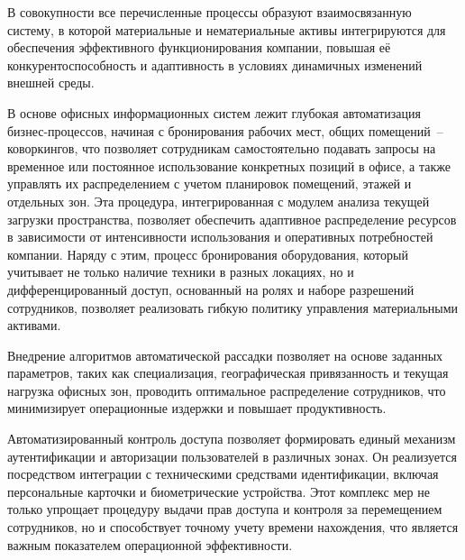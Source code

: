 В совокупности все перечисленные процессы образуют взаимосвязанную систему, в которой материальные и нематериальные активы интегрируются для обеспечения эффективного функционирования компании, повышая её конкурентоспособность и адаптивность в условиях динамичных изменений внешней среды.

В основе офисных информационных систем лежит глубокая автоматизация бизнес-процессов, начиная с бронирования рабочих мест, общих помещений~-- коворкингов, что позволяет сотрудникам самостоятельно подавать запросы на временное или постоянное использование конкретных позиций в офисе, а также управлять их распределением с учетом планировок помещений, этажей и отдельных зон. Эта процедура, интегрированная с модулем анализа текущей загрузки пространства, позволяет обеспечить адаптивное распределение ресурсов в зависимости от интенсивности использования и оперативных потребностей компании. Наряду с этим, процесс бронирования оборудования, который учитывает не только наличие техники в разных локациях, но и дифференцированный доступ, основанный на ролях и наборе разрешений сотрудников, позволяет реализовать гибкую политику управления материальными активами. 

Внедрение алгоритмов автоматической рассадки позволяет на основе заданных параметров, таких как специализация, географическая привязанность и текущая нагрузка офисных зон, проводить оптимальное распределение сотрудников, что минимизирует операционные издержки и повышает продуктивность.

Автоматизированный контроль доступа позволяет формировать единый механизм аутентификации и авторизации пользователей в различных зонах. Он реализуется посредством интеграции с техническими средствами идентификации, включая персональные карточки и биометрические устройства. Этот комплекс мер не только упрощает процедуру выдачи прав доступа и контроля за перемещением сотрудников, но и способствует точному учету времени нахождения, что является важным показателем операционной эффективности.
